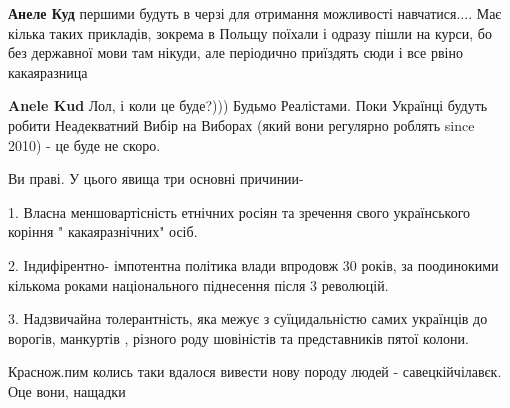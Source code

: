 \begin{itemize}
\begin{itemize}
 
\textbf{Анеле Куд} першими будуть в черзі для отримання можливості навчатися.... Має кілька таких прикладів, зокрема в Польщу поїхали і одразу пішли на курси, бо без державної мови там нікуди, але періодично приїздять сюди і все рвіно какаяразница

 
\textbf{Anele Kud} Лол, і коли це буде?))) Будьмо Реалістами. Поки Українці будуть робити Неадекватний Вибір на Виборах (який вони регулярно роблять since 2010) - це буде не скоро.
\end{itemize}

 

Ви праві. У цього явища три основні причинии- 

1. Власна меншовартісність етнічних росіян та зречення свого українського
коріння " какаяразнічних" осіб.

2. Індифірентно- імпотентна політика влади впродовж 30 років, за поодинокими
кількома роками національного піднесення після 3 революцій. 

3. Надзвичайна толерантність, яка межує з суїцидальністю самих українців до
ворогів, манкуртів , різного роду шовіністів та представників пятої колони.


 
Краснож.пим колись таки вдалося вивести нову породу людей - савецкійчілавєк. Оце вони, нащадки

 

\end{itemize}
